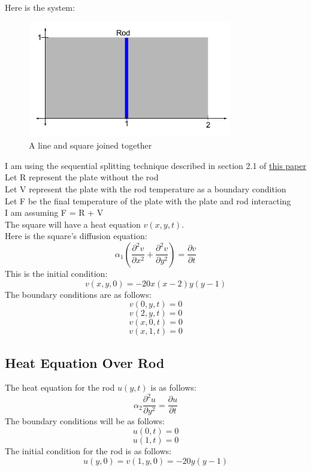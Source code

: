 \documentclass[twoside,11pt]{article}
\theoremstyle{definition}
\begin{document}
Here is the system:
\begin{figure}[h]
\centering
\includegraphics[height=2in]{PlateAndRod.png}
\caption{A line and square joined together}
\end{figure}

I am using the sequential splitting technique described in section 2.1 of \href{http://www.sciencedirect.com/science/article/pii/S0307904X07001606}{this paper}
\\
Let R represent the plate without the rod\\
Let V represent the plate with the rod temperature as a boundary condition\\
Let F be the final temperature of the plate with the plate and rod interacting\\
I am assuming F = R + V\\

The square will have a heat equation $v(x,y,t)$. \\
Here is the square's diffusion equation:
\[
\alpha_1 (\frac{\partial^2 v}{\partial x^2} + \frac{\partial^2 v}{\partial y^2}) = \frac{\partial v}{\partial t}
\]
This is the initial condition:
\[
v(x,y,0) = -20x(x-2)y(y-1)
\]
The boundary conditions are as follows:
\[
v(0,y,t)=0
\]
\[
v(2,y,t)=0
\]
\[
v(x,0,t)=0
\]
\[
v(x,1,t)=0
\]

\newpage
\subsection{Heat Equation Over Rod}

The heat equation for the rod $u(y,t)$ is as follows:
\[
\alpha_2 \frac{\partial^2 u}{\partial y^2} = \frac{\partial u}{\partial t}
\]
The boundary conditions will be as follows:
\[
u(0,t)=0
\]
\[
u(1,t)=0
\]
The initial condition for the rod is as follows:
\[
u(y,0)=v(1,y,0)=-20y(y-1)
\]
\end{document}
